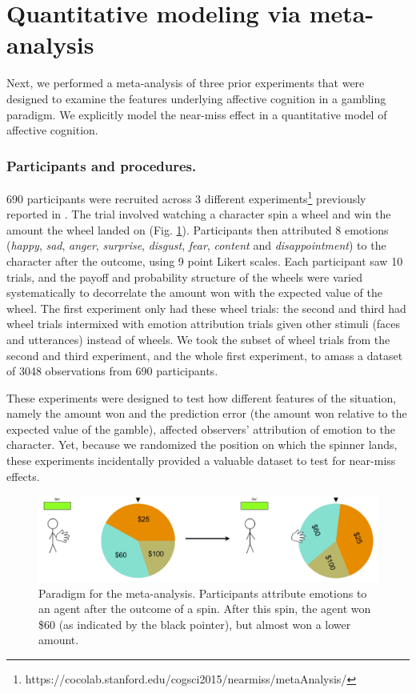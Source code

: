 \documentclass[10pt,letterpaper]{article}
\begin{document}



\section{Quantitative modeling via meta-analysis}
	Next, we performed a meta-analysis of three prior experiments that were designed to examine the features underlying affective cognition in a gambling paradigm. We explicitly model the near-miss effect in a quantitative model of affective cognition.
	
\subsubsection{Participants and procedures.}
	690 participants were recruited across 3 different experiments\footnote{https://cocolab.stanford.edu/cogsci2015/nearmiss/metaAnalysis/} previously reported in . The trial involved watching a character spin a wheel and win the amount the wheel landed on (Fig. \ref{Expt3ParadigmFig}). Participants then attributed 8 emotions (\textit{happy}, \textit{sad}, \textit{anger}, \textit{surprise}, \textit{disgust}, \textit{fear}, \textit{content} and \textit{disappointment}) to the character after the outcome, using 9 point Likert scales. Each participant saw 10 trials, and the payoff and probability structure of the wheels were varied systematically to decorrelate the amount won with the expected value of the wheel. The first experiment only had these wheel trials: the second and third had wheel trials intermixed with emotion attribution trials given other stimuli (faces and utterances) instead of wheels. We took the subset of wheel trials from the second and third experiment, and the whole first experiment, to amass a dataset of 3048 observations from 690 participants.
	
	These experiments were designed to test how different features of the situation, namely the amount won and the prediction error (the amount won relative to the expected value of the gamble), affected observers' attribution of emotion to the character. Yet, because we randomized the position on which the spinner lands, these experiments incidentally provided a valuable dataset to test for near-miss effects.

\begin{figure}[htb!]
\includegraphics[width=\columnwidth]{images/expt3Paradigm.png}
\caption{ Paradigm for the meta-analysis. Participants attribute emotions to an agent after the outcome of a spin. After this spin, the agent won \$60 (as indicated by the black pointer), but almost won a lower amount. }
\label{Expt3ParadigmFig}
\end{figure}
\end{document}
